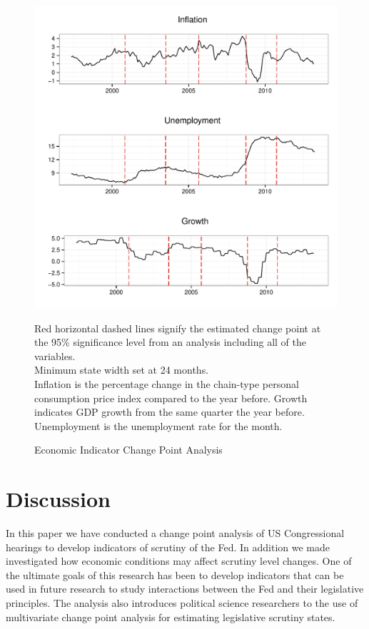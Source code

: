 \documentclass[a4paper]{article}\usepackage[]{graphicx}\usepackage[]{color}
\newenvironment{knitrout}{}{} %
\begin{document}
\begin{figure}
    \caption{Economic Indicator Change Point Analysis}
    \label{fig:FullEconCP}
\begin{knitrout}
\color{fgcolor}

{\centering \includegraphics[width=0.8\linewidth]{figure/EconFullCP} 

}



\end{knitrout}
{\scriptsize{Red horizontal dashed lines signify the estimated change point at the 95\% significance level from an analysis including all of the variables.\\
Minimum state width set at 24 months. \\
Inflation is the percentage change in the chain-type personal consumption price index compared to the year before. Growth indicates GDP growth from the same quarter the year before. Unemployment is the unemployment rate for the month.}}
\end{figure}


\section{Discussion}

In this paper we have conducted a change point analysis of US Congressional hearings to develop indicators of scrutiny of the Fed. In addition we made investigated how economic conditions may affect scrutiny level changes. One of the ultimate goals of this research has been to develop indicators that can be used in future research to study interactions between the Fed and their legislative principles. The analysis also introduces political science researchers to the use of multivariate change point analysis for estimating legislative scrutiny states.
\end{document}
